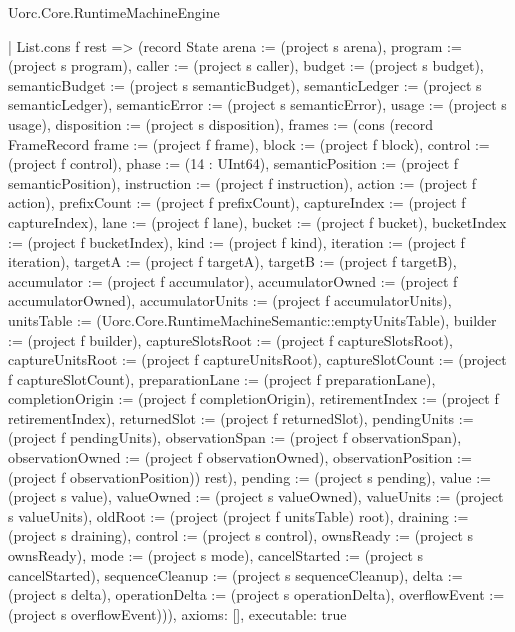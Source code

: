 \begin{lexlean}{Uorc.Core.RuntimeMachineEngine}
\begin{semanticmodule}
{    | List.cons f rest => (record State {arena := (project s arena), program := (project s program), caller := (project s caller), budget := (project s budget), semanticBudget := (project s semanticBudget), semanticLedger := (project s semanticLedger), semanticError := (project s semanticError), usage := (project s usage), disposition := (project s disposition), frames := (cons (record FrameRecord {frame := (project f frame), block := (project f block), control := (project f control), phase := (14 : UInt64), semanticPosition := (project f semanticPosition), instruction := (project f instruction), action := (project f action), prefixCount := (project f prefixCount), captureIndex := (project f captureIndex), lane := (project f lane), bucket := (project f bucket), bucketIndex := (project f bucketIndex), kind := (project f kind), iteration := (project f iteration), targetA := (project f targetA), targetB := (project f targetB), accumulator := (project f accumulator), accumulatorOwned := (project f accumulatorOwned), accumulatorUnits := (project f accumulatorUnits), unitsTable := (Uorc.Core.RuntimeMachineSemantic::emptyUnitsTable), builder := (project f builder), captureSlotsRoot := (project f captureSlotsRoot), captureUnitsRoot := (project f captureUnitsRoot), captureSlotCount := (project f captureSlotCount), preparationLane := (project f preparationLane), completionOrigin := (project f completionOrigin), retirementIndex := (project f retirementIndex), returnedSlot := (project f returnedSlot), pendingUnits := (project f pendingUnits), observationSpan := (project f observationSpan), observationOwned := (project f observationOwned), observationPosition := (project f observationPosition)}) rest), pending := (project s pending), value := (project s value), valueOwned := (project s valueOwned), valueUnits := (project s valueUnits), oldRoot := (project (project f unitsTable) root), draining := (project s draining), control := (project s control), ownsReady := (project s ownsReady), mode := (project s mode), cancelStarted := (project s cancelStarted), sequenceCleanup := (project s sequenceCleanup), delta := (project s delta), operationDelta := (project s operationDelta), overflowEvent := (project s overflowEvent)})),
  axioms: [],
  executable: true
}


\end{semanticmodule}
\end{lexlean}
